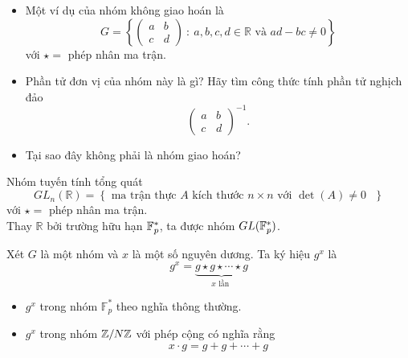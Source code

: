 \begin{frame}
	\begin{xrcs}
		\begin{itemize}
			\item<+-> Một ví dụ của nhóm không giao hoán là 
			$$
			G = \left\{ \begin{pmatrix}
				a & b\\
				c & d
			\end{pmatrix}\ :\ a,b,c,d \in \mathbb{R} \text{ và } ad - bc \not= 0 \right\}
			$$
			với $\star =$ phép nhân ma trận. 
			\item<+-> Phần tử đơn vị của nhóm này là gì? Hãy tìm công thức tính phần tử nghịch đảo 
			$$
			\begin{pmatrix}
							a & b\\
							c & d
						\end{pmatrix}^{-1}.
			$$
			
			\item<+-> Tại sao đây không phải là nhóm giao hoán?
		\end{itemize}
	\end{xrcs}
\end{frame}

\begin{frame}
	\begin{xmpl} Nhóm tuyến tính tổng quát 
			$$
			GL_n(\mathbb{R}) = \left\{ \text{ ma trận thực $A$ kích thước $n\times n$ với $\det(A)\not= 0$ } \right\}
			$$
			với $\star =$ phép nhân ma trận. \\
			
			\vspace{0.5cm}
			 Thay $\mathbb{R}$ bởi trường hữu hạn $\mathbb{F}_p^*$, ta được nhóm $GL(\mathbb{F}_p^*)$.
			
			
	\end{xmpl}
\end{frame}

\begin{frame}
	\begin{dfntn}
		Xét $G$ là một nhóm và $x$ là một số nguyên dương. Ta ký hiệu $g^x$ là 
		$$
		g^x = \underbrace{g\star g\star \cdots \star g}_{x \text{ lần }}
		$$
	\end{dfntn}
\end{frame}

\begin{frame}
	\begin{xmpl}
		\begin{itemize}
			\item<+-> $g^x$ trong nhóm $\mathbb{F}_p^*$ theo nghĩa thông thường.
			\item<+-> $g^x$ trong nhóm $\mathbb{Z}/N\mathbb{Z}$ với phép cộng có nghĩa rằng $$x \cdot g = g+g+\cdots +g$$ 
		\end{itemize}
	\end{xmpl}
\end{frame}



